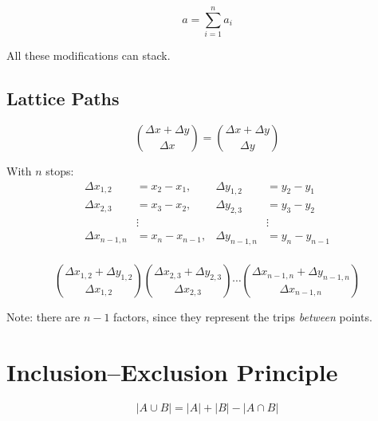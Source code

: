 \documentclass{article}
\begin{document}
    $$a = \sum_{i=1}^n{a_i}$$

    All these modifications can stack.
        
    \subsection{Lattice Paths}

    \begin{equation}
        {\Delta x + \Delta y \choose \Delta x} = {\Delta x + \Delta y \choose \Delta y}
    \end{equation}

    With $n$ stops: \begin{align*}
        \Delta x_{1,2} & = x_2 - x_1, & \Delta y_{1,2} &= y_2 - y_1 \\
        \Delta x_{2,3} & = x_3 - x_2, & \Delta y_{2,3} &= y_3 - y_2 \\
        & \vdots & & \vdots \\
        \Delta x_{n - 1,n} & = x_n - x_{n - 1}, & \Delta y_{n - 1,n} &= y_n - y_{n - 1} \\
    \end{align*}
    
    \begin{equation}
        {\Delta x_{1,2} + \Delta y_{1,2} \choose \Delta x_{1,2}} {\Delta x_{2,3} + \Delta y_{2,3} \choose \Delta x_{2,3}} \cdots {\Delta x_{n - 1,n} + \Delta y_{n - 1,n} \choose \Delta x_{n - 1,n}} 
    \end{equation}

    Note: there are $n - 1$ factors, since they represent the trips \textit{between} points.
    
    \section{Inclusion–Exclusion Principle}

    \begin{equation}
        |A \cup B| = |A| + |B| - |A \cap B|
    \end{equation}
\end{document}
